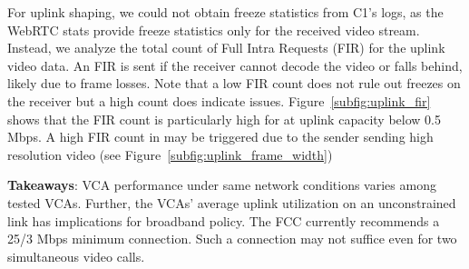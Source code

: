 For uplink shaping, we could not obtain freeze statistics from C1's logs, as the WebRTC stats provide freeze statistics only for the received video stream. Instead, we analyze the total count of Full Intra Requests (FIR) for the uplink video data. An FIR is sent if the receiver cannot decode the video or falls behind, likely due to frame losses. Note that a low FIR count does not rule out freezes on the receiver but a high count does indicate issues. Figure~\ref{subfig:uplink_fir} shows that the FIR count is particularly high for \teamsbrowser at uplink capacity below 0.5 Mbps. A high FIR count in \teamsbrowser may be triggered due to the sender sending high resolution video (see Figure~\ref{subfig:uplink_frame_width})



\begin{mdframed}[roundcorner=5pt, backgroundcolor=black!10]
\textbf{Takeaways}: VCA performance under same network conditions varies among tested VCAs. Further, the VCAs' average uplink utilization on an unconstrained link has implications for broadband policy. The FCC currently recommends a 25/3 Mbps minimum connection. Such a connection may not suffice even for two simultaneous video calls. 
\end{mdframed}









